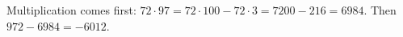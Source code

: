 Multiplication comes first: $72\cdot97=72\cdot100-72\cdot3=7200-216=6984$. Then $972-6984=\boxed{-6012}$.
